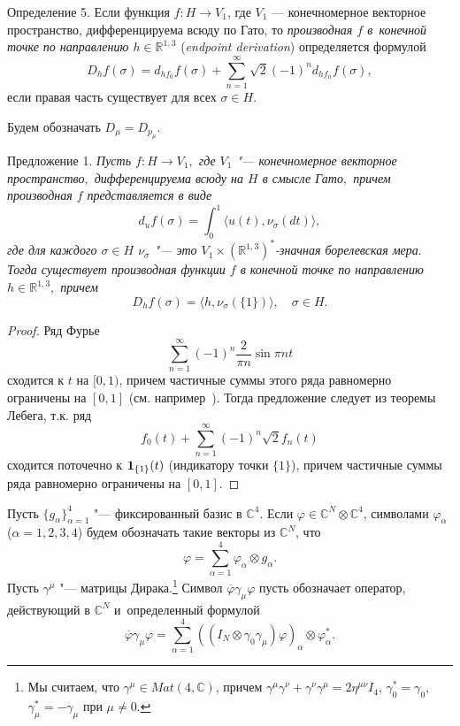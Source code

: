\smallskip

\hypertarget{volk:def5}{}

{\small \sc Определение 5.}  Если функция
$f\colon H\to V_1$, где $V_1$ --- конечномерное векторное пространство, дифференцируема всюду по Гато, то 
{\it производная $f$ в~конечной точке по направлению $h\in \mathbb{R}^{1,3}$} ({\it endpoint derivation}\/) определяется формулой
$$
D_hf(\sigma)=d_{hf_0}f(\sigma)+\sum_{n=1}^\infty\sqrt{2}(-1)^nd_{hf_n}f(\sigma),
$$
если правая часть существует для всех $\sigma\in H$.


\smallskip

Будем обозначать $D_\mu=D_{p_\mu}$.

\smallskip

\hypertarget{volk:pr1}{}

{\small\sc Предложение 1.} {\it
Пусть $f:H\to V_1,$ где $V_1$ "--- конечномерное векторное пространство$,$
дифференцируема всюду на $H$ в смысле Гато$,$ причем  производная $f$ представляется в виде
\begin{equation}
\label{volk:fgateux}
d_uf(\sigma)=\int_0^1 \langle u(t),\nu_\sigma(dt)\rangle,
\end{equation}
где для каждого $\sigma\in H$ $\nu_\sigma$ "--- это $V_1\times(\mathbb{R}^{1,3})^*$-значная  борелевская мера$.$
Тогда существует производная функции $f$ в конечной точке по направлению ${h\in \mathbb{R}^{1, 3},}$ причем
$$
D_hf(\sigma)=\langle h,\nu_\sigma(\{1\})\rangle, \quad  \sigma\in H.
$$
}

\smallskip

\begin{proof}
Ряд Фурье 
$$\sum_{n=1}^\infty(-1)^n\frac 2{\pi n}\sin{\pi nt}$$ сходится к $t$ на $[0, 1)$,
 причем  частичные суммы этого ряда равномерно ограничены на $[0, 1]$
(см. например~\cite[с.~555]{volkov:bib:F}).
Тогда предложение следует из теоремы Лебега, т.к. ряд
$$
f_0(t)+\sum_{n=1}^\infty(-1)^n\sqrt{2}f_n(t)
 $$
сходится поточечно к ${\bf 1}_{\{1\}}(t)$ (индикатору точки $\{1\}$),  причем  частичные суммы  ряда равномерно ограничены на $[0, 1]$.
\end{proof}

\smallskip



Пусть $\{g_\alpha\}_{\alpha=1}^4$ "--- фиксированный базис в $\mathbb{C}^4$.
Если $\varphi\in \mathbb{C}^N\otimes\mathbb{C}^4$, символами $\varphi_\alpha$ ($\alpha=1, 2, 3, 4$)
  будем обозначать такие векторы из $\mathbb{C}^N$, что
  $$\varphi=\sum_{\alpha=1}^4\varphi_\alpha\otimes g_\alpha.$$
  Пусть $\gamma^\mu$ "--- матрицы Дирака.\!\footnote{Мы считаем, что
  $\gamma^\mu\in Mat(4,\mathbb{C})$, причем
 $\gamma^\mu\gamma^\nu+\gamma^\nu\gamma^\mu=2\eta^{\mu\nu}I_4$, $\gamma_0^\ast=\gamma_0$, $\gamma_\mu^*=-\gamma_\mu$ при $\mu \neq 0$.}
  Символ $\overline{\varphi}\gamma_\mu\varphi$ пусть обозначает оператор,
  действующий в $\mathbb{C}^N$ и~определенный формулой 
  $$\overline{\varphi}\gamma_\mu\varphi=\sum_{\alpha=1}^4
((I_N\otimes\gamma_0\gamma_\mu)\varphi)_\alpha\otimes\varphi_\alpha^\ast.$$


